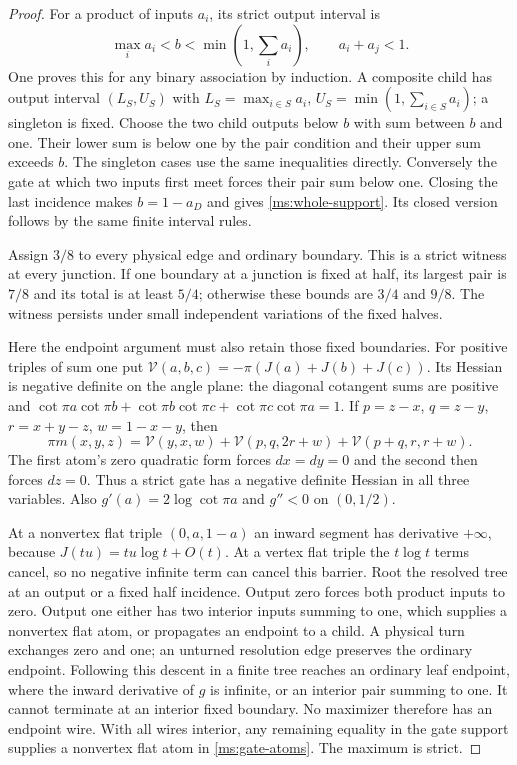 \begin{proof}
For a product of inputs $a_i$, its strict output interval is
\[
 \max_i a_i<b<\min(1,\sum_i a_i),\qquad a_i+a_j<1.
\]
One proves this for any binary association by induction. A composite
child has output interval $(L_S,U_S)$ with
$L_S=\max_{i\in S}a_i$, $U_S=\min(1,\sum_{i\in S}a_i)$;
a singleton is fixed. Choose the two child outputs below $b$ with
sum between $b$ and one. Their lower sum is below one by the pair
condition and their upper sum exceeds $b$. The singleton cases use
the same inequalities directly. Conversely the gate at which two
inputs first meet forces their pair sum below one. Closing the last
incidence makes $b=1-a_D$ and gives \eqref{ms:whole-support}.
Its closed version follows by the same finite interval rules.

Assign $3/8$ to every physical edge and ordinary boundary. This is
a strict witness at every junction. If one boundary at a junction
is fixed at half, its largest pair is $7/8$ and its total is at least
$5/4$; otherwise these bounds are $3/4$ and $9/8$. The witness
persists under small independent variations of the fixed halves.

Here the endpoint argument must also retain those fixed boundaries.
For positive triples of sum one put
$\mathcal V(a,b,c)=-\pi(J(a)+J(b)+J(c))$. Its Hessian is
negative definite on the angle plane: the diagonal cotangent sums
are positive and
$\cot\pi a\cot\pi b+\cot\pi b\cot\pi c+
\cot\pi c\cot\pi a=1$.
If $p=z-x$, $q=z-y$, $r=x+y-z$, $w=1-x-y$, then
\begin{equation}\label{ms:gate-atoms}
 \pi m(x,y,z)=\mathcal V(y,x,w)
   +\mathcal V(p,q,2r+w)+\mathcal V(p+q,r,r+w).
\end{equation}
The first atom's zero quadratic form forces $dx=dy=0$ and the
second then forces $dz=0$. Thus a strict gate has a negative
definite Hessian in all three variables. Also
$g'(a)=2\log\cot\pi a$ and $g''<0$ on $(0,1/2)$.

At a nonvertex flat triple $(0,a,1-a)$ an inward segment has
derivative $+\infty$, because $J(tu)=tu\log t+O(t)$.
At a vertex flat triple the $t\log t$ terms cancel, so no negative
infinite term can cancel this barrier. Root the resolved tree at an
output or a fixed half incidence. Output zero forces both product
inputs to zero. Output one either has two interior inputs summing to
one, which supplies a nonvertex flat atom, or propagates an endpoint
to a child. A physical turn exchanges zero and one; an unturned
resolution edge preserves the ordinary endpoint. Following this
descent in a finite tree reaches an ordinary leaf endpoint, where
the inward derivative of $g$ is infinite, or an interior pair summing
to one. It cannot terminate at an interior fixed boundary. No
maximizer therefore has an endpoint wire. With all wires interior,
any remaining equality in the gate support supplies a nonvertex
flat atom in \eqref{ms:gate-atoms}. The maximum is strict.


\end{proof}

